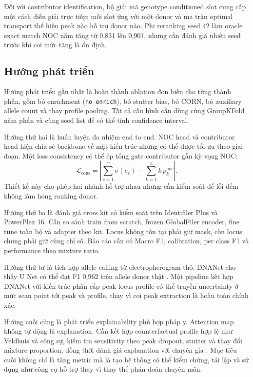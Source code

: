 \documentclass[12pt,a4paper]{article}
\begin{document}
Đối với contributor identification, bộ giải mã genotype conditioned slot cung cấp một cách diễn giải trực tiếp: mỗi slot ứng với một donor và ma trận optimal transport thể hiện peak nào hỗ trợ donor nào. Phi reranking seed 42 làm oracle exact match NOC năm tăng từ 0,831 lên 0,901, nhưng cần đánh giá nhiều seed trước khi coi mức tăng là ổn định.

\subsection{Hướng phát triển}

Hướng phát triển gần nhất là hoàn thành ablation đơn biến cho từng thành phần, gồm bỏ enrichment (\texttt{no\_enrich}), bỏ stutter bias, bỏ CORN, bỏ auxiliary allele count và thay profile pooling. Tất cả cấu hình cần dùng cùng GroupKFold năm phần và cùng seed list để có thể tính confidence interval.

Hướng thứ hai là huấn luyện đa nhiệm end to end. NOC head và contributor head hiện chia sẻ backbone về mặt kiến trúc nhưng có thể được tối ưu theo giai đoạn. Một loss consistency có thể ép tổng gate contributor gần kỳ vọng NOC:
\begin{equation}
\mathcal{L}_{\mathrm{cons}}=
\left|
\sum_{c=1}^{C}\sigma(e_c)
-\sum_{k=1}^{5}k\,p_k^{\mathrm{noc}}
\right|.
\end{equation}
Thiết kế này cho phép hai nhánh hỗ trợ nhau nhưng cần kiểm soát để lỗi đếm không làm hỏng ranking donor.

Hướng thứ ba là đánh giá cross kit có kiểm soát trên Identifiler Plus và PowerPlex 16. Cần so sánh train from scratch, frozen GlobalFiler encoder, fine tune toàn bộ và adapter theo kit. Locus không tồn tại phải giữ mask, còn locus chung phải giữ cùng chỉ số. Báo cáo cần có Macro F1, calibration, per class F1 và performance theo mixture ratio.

Hướng thứ tư là tích hợp allele calling từ electropherogram thô. DNANet cho thấy U Net có thể đạt F1 0,962 trên allele donor thật \cite{dewit2025}. Một pipeline kết hợp DNANet với kiến trúc phân cấp peak-locus-profile có thể truyền uncertainty ở mức scan point tới peak và profile, thay vì coi peak extraction là hoàn toàn chính xác.

Hướng cuối cùng là phát triển explainability phù hợp pháp y. Attention map không tự động là explanation. Cần kết hợp counterfactual profile hợp lệ như Veldhuis và cộng sự, kiểm tra sensitivity theo peak dropout, stutter và thay đổi mixture proportion, đồng thời đánh giá explanation với chuyên gia \cite{veldhuis2022}. Mục tiêu cuối không chỉ là tăng metric mà là tạo hệ thống có thể kiểm chứng, tái lập và sử dụng như công cụ hỗ trợ thay vì thay thế phán đoán chuyên môn.
\end{document}
